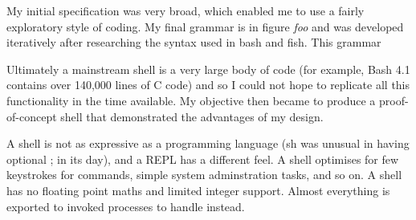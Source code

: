\documentclass[12pt,twoside,notitlepage]{report}
\begin{document}
My initial specification was very broad, which enabled me to use a fairly
exploratory style of coding. My final grammar is in figure {\em foo} and was
developed iteratively after researching the syntax used in bash and fish. This grammar 

Ultimately a mainstream shell is a very large body of code (for
example, Bash 4.1 contains over 140,000 lines of C
code\footnotemark[1]) and so I could not hope to replicate all this
functionality in the time available. My objective then became to
produce a proof-of-concept shell that demonstrated the advantages of
my design.





A shell is not as expressive as a programming language (sh was unusual in having
optional ; in its day), and a REPL has a different feel. A shell optimises for
few keystrokes for commands, simple system adminstration tasks, and so on. A
shell has no floating point maths and limited integer support. Almost everything
is exported to invoked processes to handle instead.


\end{document}
